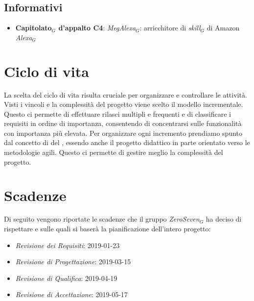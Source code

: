 \subsection{Informativi}
\begin{itemize}
	\item \textbf{Capitolato$_{G}$ d'appalto C4}: \textit{MegAlexa$_{G}$}: arricchitore di \textit{skill$_{G}$} di Amazon \textit{Alexa$_{G}$}
\end{itemize}
\section{Ciclo di vita}
La scelta del ciclo di vita risulta cruciale per organizzare e controllare le attività. Visti i vincoli e la complessità del progetto viene scelto il modello incrementale. Questo ci permette di effettuare rilasci multipli e frequenti e di classificare i requisiti in ordine di importanza, consentendo di concentrarsi sulle funzionalità con importanza più elevata. Per organizzare ogni incremento prendiamo spunto dal concetto di  del  , essendo anche il progetto didattico in parte orientato verso le metodologie agili. Questo ci permette di gestire meglio la complessità del progetto.
\section{Scadenze}
Di seguito vengono riportate le scadenze che il gruppo \textit{ZeroSeven$_{G}$} ha deciso di rispettare e sulle quali si baserà la pianificazione dell'intero progetto:
\begin{itemize}
	\item \textit{Revisione dei Requisiti}: 2019-01-23
	\item \textit{Revisione di Progettazione}: 2019-03-15
	\item \textit{Revisione di Qualifica}: 2019-04-19
	\item \textit{Revisione di Accettazione}: 2019-05-17
\end{itemize}
